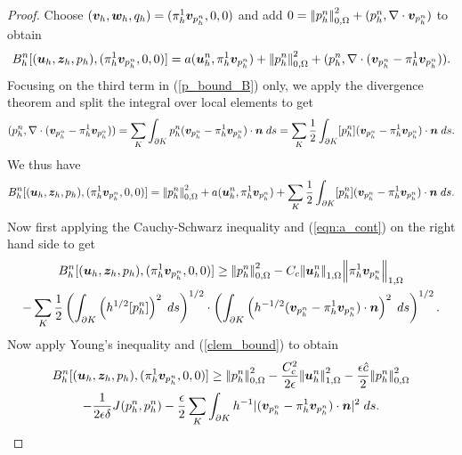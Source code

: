 \begin{proof}
 \newline
Choose $\disctripletest = (\projscott {\vphn} ,0,0)$ and add $0=\ltwonorm{\pdiscn}^{2} + (\pdiscn, \nabla \cdot {\vphn})$ to obtain
\begin{equation}
 B_{h}^{n}[\disctriple,(\projscott {\vphn},0,0)] = a(\dispdiscn,\projscott {\vphn}) + \ltwonorm{\pdiscn}^{2} + (\pdiscn, \nabla \cdot ( {\vphn} - \projscott {\vphn} )).
 \label{p_bound_B}
\end{equation}
\noindent Focusing on the third term in (\ref{p_bound_B}) only, we apply the divergence theorem and split the integral over local elements to get
\begin{equation*}
 (\pdiscn, \nabla \cdot ({\vphn} - \projscott {\vphn}))= \sum_{K} \int_{\partial K }  \pdiscn   ({\vphn} - \projscott {\vphn}) \cdot \normal \;{d}s=\sum_{K} \frac{1}{2}\int_{\partial K }  [\pdiscn]   ({\vphn} - \projscott {\vphn}) \cdot \normal \;ds.
\end{equation*}
We thus have
\begin{equation*}
  B_{h}^{n}[\disctriple,(\projscott {\vphn},0,0)]  =\ltwonorm{\pdiscn}^{2}+  a(\dispdiscn,\projscott {\vphn})+  \sum_{K} \frac{1}{2}\int_{\partial K }  [\pdiscn]   ({\vphn} - \projscott {\vphn}) \cdot \normal \;{d}s.
\end{equation*}
Now first applying the Cauchy-Schwarz inequality and (\ref{eqn:a_cont}) on the right hand side to get
\begin{multline*}
  B_{h}^{n}[\disctriple,(\projscott {\vphn},0,0)]  \geq \ltwonorm{\pdiscn}^{2} - C_{c} \honenorm{\dispdiscn} \honenorm{\projscott {\vphn}} \\ -  \sum_{K} \frac{1}{2} \left( \int_{\partial K } \left(h^{1/2} [\pdiscn]\right)^{2} \;ds \right)^{1/2} \cdot \left( \int_{\partial K } \left( h^{-1/2} ({\vphn} - \projscott {\vphn}) \cdot \normal\right)^{2} \;ds \right)^{1/2}.
\end{multline*}
Now apply Young's inequality and (\ref{clem_bound}) to obtain
\begin{multline*}
  B_{h}^{n}[\disctriple,(\projscott {\vphn},0,0)]  \geq \ltwonorm{\pdiscn}^{2} -  \frac{C_{c}^{2}}{2\epsilon} \honenorm{\dispdiscn}^{2}-\frac{\epsilon \hat{c}}{2} \ltwonorm{\pdiscn}^{2} \\ -  \frac{1}{2\epsilon\delta}  J(\pdiscn,\pdiscn) - \frac{\epsilon}{2} \sum_{K} \int_{\partial K } h^{-1} |({\vphn} - \projscott {\vphn}) \cdot \normal|^{2} \;ds .
\end{multline*}


\end{proof}
